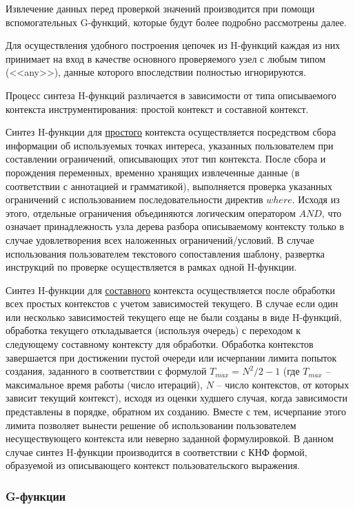 Извлечение данных перед проверкой значений производится при помощи вспомогательных G-функций, которые будут более подробно рассмотрены далее.

Для осуществления удобного построения цепочек из H-функций каждая из них принимает на вход в качестве основного проверяемого узел с любым типом (<<any>>), данные которого впоследствии полностью игнорируются.

Процесс синтеза H-функций различается в зависимости от типа описываемого контекста инструментирования:
простой контекст и
составной контекст.

Синтез H-функции для \underline{простого} контекста осуществляется посредством сбора информации об используемых точках интереса, указанных пользователем при составлении ограничений, описывающих этот тип контекста.
После сбора и порождения переменных, временно хранящих извлеченные данные (в соответствии с аннотацией и грамматикой), выполняется проверка указанных ограничений с использованием последовательности директив $where$.
Исходя из этого, отдельные ограничения объединяются логическим оператором $AND$, что означает принадлежность узла дерева разбора описываемому контексту только в случае удовлетворения всех наложенных ограничений/условий.
В случае использования пользователем текстового сопоставления шаблону, развертка инструкций по проверке осуществляется в рамках одной H-функции.

Синтез H-функции для \underline{составного} контекста осуществляется после обработки всех простых контекстов с учетом зависимостей текущего.
В случае если один или несколько зависимостей текущего еще не были созданы в виде H-функций, обработка текущего откладывается (используя очередь) с переходом к следующему составному контексту для обработки.
Обработка контекстов завершается при достижении пустой очереди или исчерпании лимита попыток создания, заданного в соответствии с формулой $T_{max}=N^2/2-1$ (где $T_{max}$ -- максимальное время работы (число итераций), $N$ -- число контекстов, от которых зависит текущий контекст), исходя из оценки худшего случая, когда зависимости представлены в порядке, обратном их созданию.
Вместе с тем, исчерпание этого лимита позволяет вынести решение об использовании пользователем несуществующего контекста или неверно заданной формулировкой.
В данном случае синтез H-функции производится в соответствии с КНФ формой, образуемой из описывающего контекст пользовательского выражения.

\subsubsection{G-функции}

